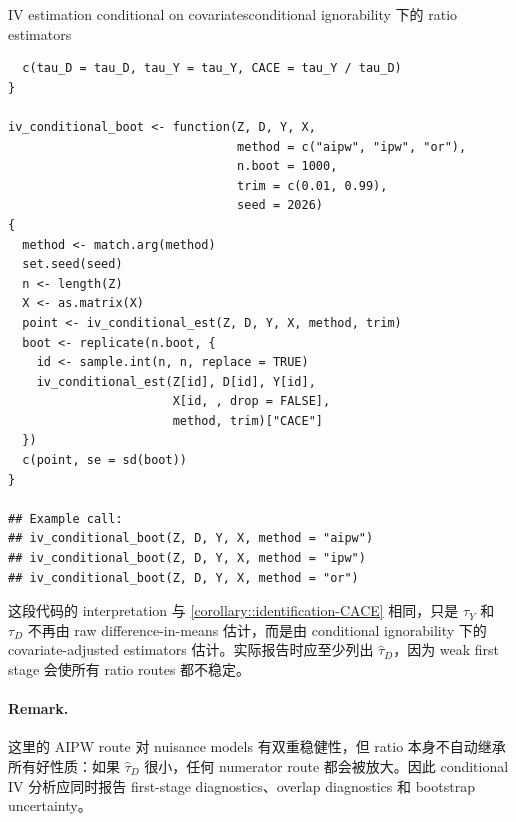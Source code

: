\begin{exercisesolution}{IV estimation conditional on covariates}{conditional ignorability 下的 ratio estimators}
\begin{lstlisting}
  c(tau_D = tau_D, tau_Y = tau_Y, CACE = tau_Y / tau_D)
}

iv_conditional_boot <- function(Z, D, Y, X,
                                method = c("aipw", "ipw", "or"),
                                n.boot = 1000,
                                trim = c(0.01, 0.99),
                                seed = 2026)
{
  method <- match.arg(method)
  set.seed(seed)
  n <- length(Z)
  X <- as.matrix(X)
  point <- iv_conditional_est(Z, D, Y, X, method, trim)
  boot <- replicate(n.boot, {
    id <- sample.int(n, n, replace = TRUE)
    iv_conditional_est(Z[id], D[id], Y[id],
                       X[id, , drop = FALSE],
                       method, trim)["CACE"]
  })
  c(point, se = sd(boot))
}

## Example call:
## iv_conditional_boot(Z, D, Y, X, method = "aipw")
## iv_conditional_boot(Z, D, Y, X, method = "ipw")
## iv_conditional_boot(Z, D, Y, X, method = "or")
\end{lstlisting}

这段代码的 interpretation 与 \cref{corollary::identification-CACE} 相同，只是 $\tau_Y$ 和 $\tau_D$ 不再由 raw difference-in-means 估计，而是由 conditional ignorability 下的 covariate-adjusted estimators 估计。实际报告时应至少列出 $\hat{\tau}_D$，因为 weak first stage 会使所有 ratio routes 都不稳定。

\paragraph{Remark.}
这里的 AIPW route 对 nuisance models 有双重稳健性，但 ratio 本身不自动继承所有好性质：如果 $\hat{\tau}_D$ 很小，任何 numerator route 都会被放大。因此 conditional IV 分析应同时报告 first-stage diagnostics、overlap diagnostics 和 bootstrap uncertainty。
\end{exercisesolution}

